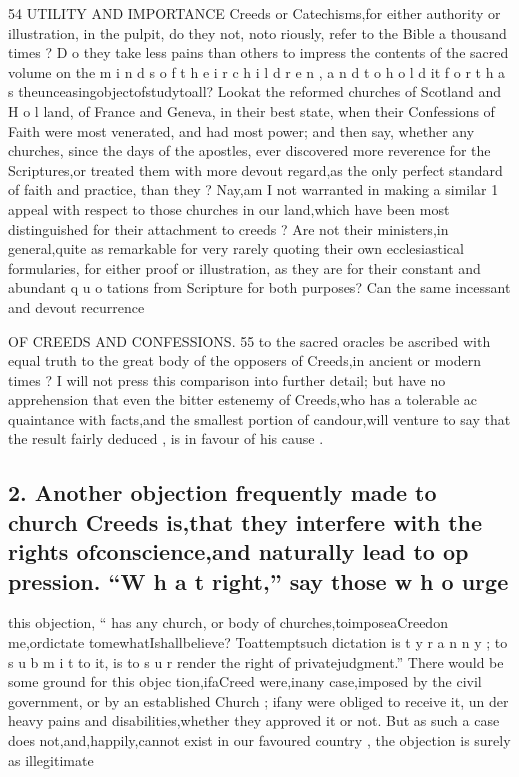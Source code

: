 \documentclass[
]{book}
\begin{document}
54
UTILITY AND IMPORTANCE
Creeds or Catechisms,for either authority or
illustration, in the pulpit, do they not, noto riously, refer to the Bible a thousand times ?
D o they take less pains than others to impress the contents of the sacred volume on the
m i n d s o f t h e i r c h i l d r e n , a n d t o h o l d it f o r t h a s theunceasingobjectofstudytoall? Lookat the reformed churches of Scotland and H o l land, of France and Geneva, in their best state, when their Confessions of Faith were most venerated, and had most power; and then say, whether any churches, since the days of the apostles, ever discovered more reverence for the Scriptures,or treated them with more devout regard,as the only perfect
standard of faith and practice, than they ?
Nay,am I not warranted in making a similar 1 appeal with respect to those churches in our land,which have been most distinguished for
their attachment to creeds ? Are not their ministers,in general,quite as remarkable for very rarely quoting their own ecclesiastical formularies, for either proof or illustration, as they are for their constant and abundant q u o tations from Scripture for both purposes? Can the same incessant and devout recurrence

OF CREEDS AND CONFESSIONS. 55
to the sacred oracles be ascribed with equal truth to the great body of the opposers of Creeds,in ancient or modern times ? I will not press this comparison into further detail; but have no apprehension that even the bitter estenemy of Creeds,who has a tolerable ac
quaintance with facts,and the smallest portion of candour,will venture to say that the result fairly deduced , is in favour of his cause .

\hypertarget{another-objection-frequently-made-to-church-creeds-isthat-they-interfere-with-the-rights-ofconscienceand-naturally-lead-to-op-pression.-w-h-a-t-right-say-those-w-h-o-urge}{%
\subsection{2. Another objection frequently made to church Creeds is,that they interfere with the rights ofconscience,and naturally lead to op pression. ``W h a t right,'' say those w h o urge}\label{another-objection-frequently-made-to-church-creeds-isthat-they-interfere-with-the-rights-ofconscienceand-naturally-lead-to-op-pression.-w-h-a-t-right-say-those-w-h-o-urge}}

this objection, `` has any church, or body of churches,toimposeaCreedon me,ordictate tomewhatIshallbelieve? Toattemptsuch dictation is t y r a n n y ; to s u b m i t to it, is to s u r render the right of privatejudgment.''
There would be some ground for this objec tion,ifaCreed were,inany case,imposed by the civil government, or by an established Church ; ifany were obliged to receive it, un
der heavy pains and disabilities,whether they approved it or not. But as such a case does
not,and,happily,cannot exist in our favoured country , the objection is surely as illegitimate
\end{document}
